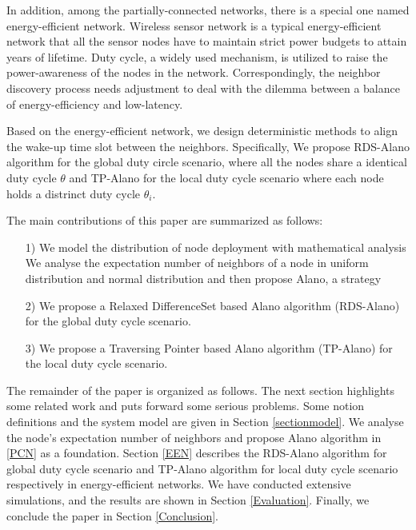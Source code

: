  
 
In addition, among the partially-connected networks, there is a special 
one named energy-efficient network.
Wireless sensor network is a typical energy-efficient network that all the sensor nodes have to maintain 
strict power budgets to attain years of lifetime\cite{dunkels2011contikimac}.
Duty cycle, a widely used mechanism, is utilized to raise the power-awareness of the nodes in the network.
Correspondingly, the neighbor discovery process needs adjustment to deal with the dilemma between 
a balance of energy-efficiency and low-latency.

Based on the energy-efficient network, we design deterministic methods to align the wake-up time slot between the neighbors.
Specifically, We propose RDS-Alano algorithm for the global duty circle scenario, where 
all the nodes share a identical duty cycle $\theta$ and TP-Alano for the
local duty cycle scenario where each node holds a distrinct duty cycle $\theta_i$. 







The main contributions of this paper are summarized as follows:
\begin{itemize}
\item[1)] We model the distribution of node deployment with mathematical analysis 
We analyse the expectation number of neighbors of a node in uniform distribution and normal
distribution and then propose Alano, a strategy
\item[2)] We propose a Relaxed DifferenceSet based Alano algorithm (RDS-Alano) 
for the global duty cycle scenario. 
\item[3)] We propose a Traversing Pointer based Alano algorithm (TP-Alano) 
for the local duty cycle scenario. 
\end{itemize}




The remainder of the paper is organized as follows.
The next section highlights some related work and 
puts forward some serious problems. 
Some notion definitions and the system model are given in Section
\ref{sectionmodel}. 
We analyse the node's expectation number of neighbors and 
propose Alano algorithm in \ref{PCN} as a foundation.
Section \ref{EEN} describes the RDS-Alano algorithm for global
duty cycle scenario and TP-Alano algorithm for local duty cycle scenario
respectively in energy-efficient networks.
We have conducted extensive simulations, and the results are shown in Section
\ref{Evaluation}. Finally, we conclude the paper in Section
\ref{Conclusion}.


